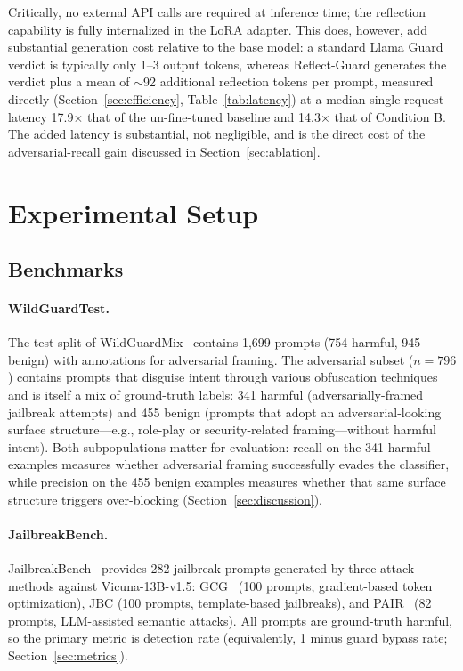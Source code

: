 \documentclass[superintelligence,article,submit,pdftex,moreauthors]{Definitions/mdpi}
\begin{document}
Critically, no external API calls are required at inference time; the reflection capability is fully internalized in the LoRA adapter. This does, however, add substantial generation cost relative to the base model: a standard Llama Guard verdict is typically only 1--3 output tokens, whereas Reflect-Guard generates the verdict plus a mean of $\sim$92 additional reflection tokens per prompt, measured directly (Section~\ref{sec:efficiency}, Table~\ref{tab:latency}) at a median single-request latency 17.9$\times$ that of the un-fine-tuned baseline and 14.3$\times$ that of Condition B. The added latency is substantial, not negligible, and is the direct cost of the adversarial-recall gain discussed in Section~\ref{sec:ablation}.

\section{Experimental Setup}

\subsection{Benchmarks}
\label{sec:benchmarks}

\paragraph{WildGuardTest.} The test split of WildGuardMix~\citep{han2024wildguard} contains 1{,}699 prompts (754 harmful, 945 benign) with annotations for adversarial framing. The adversarial subset ($n = 796$) contains prompts that disguise intent through various obfuscation techniques and is itself a mix of ground-truth labels: 341 harmful (adversarially-framed jailbreak attempts) and 455 benign (prompts that adopt an adversarial-looking surface structure---e.g., role-play or security-related framing---without harmful intent). Both subpopulations matter for evaluation: recall on the 341 harmful examples measures whether adversarial framing successfully evades the classifier, while precision on the 455 benign examples measures whether that same surface structure triggers over-blocking (Section~\ref{sec:discussion}).

\paragraph{JailbreakBench.} JailbreakBench~\citep{chao2024jailbreakbench} provides 282 jailbreak prompts generated by three attack methods against Vicuna-13B-v1.5: GCG~\citep{zou2023universal} (100 prompts, gradient-based token optimization), JBC (100 prompts, template-based jailbreaks), and PAIR~\citep{chao2023jailbreaking} (82 prompts, LLM-assisted semantic attacks). All prompts are ground-truth harmful, so the primary metric is detection rate (equivalently, 1 minus guard bypass rate; Section~\ref{sec:metrics}).
\end{document}
